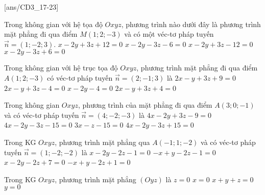 
[ans/CD3_17-23]
\TN

\begin{ex}%
	Trong không gian với hệ tọa độ $O x y z$, phương trình nào dưới đây là phương trình mặt phẳng đi qua điểm $M(1 ; 2 ;-3)$ và có một véc-tơ pháp tuyến $\vec{n}=(1 ;-2 ; 3)$.
	\choice
	{\True $x-2 y+3 z+12=0$}
	{$x-2 y-3 z-6=0$}
	{$x-2 y+3 z-12=0$}
	{$x-2 y-3 z+6=0$}
\end{ex}
\begin{ex}%
	Trong không gian với hệ trục tọa độ $Oxyz$, phương trình mặt phẳng đi qua điểm $A(1 ; 2 ;-3)$ có véc-tơ pháp tuyến $\vec{n}=(2 ;-1 ; 3)$ là
	\choice
	{\True $2 x-y+3 z+9=0$}
	{$2 x-y+3 z-4=0$}
	{$x-2 y-4=0$}
	{$2 x-y+3 z+4=0$}
\end{ex}

\begin{ex}%
	Trong không gian $O x y z$, phương trình của mặt phẳng đi qua điểm $A(3 ; 0 ;-1)$ và có véc-tơ pháp tuyến $\vec{n}=(4 ;-2 ;-3)$ là
	\choice
	{$4x-2 y+3z-9=0$}
	{\True $4x-2y-3z-15=0$}
	{$3x-z-15=0$}
	{$4x-2y-3z+15=0$}
\end{ex}

\begin{ex}%
	Trong KG $Oxyz$, phương trình mặt phẳng qua $A(-1 ; 1 ;-2)$ và có véc-tơ  pháp tuyến $\vec{n}=(1 ;-2 ;-2)$ là
	\choice
	{\True $x-2 y-2 z-1=0$}
	{$-x+y-2z-1=0$}
	{$x-2y-2z+7=0$}
	{$-x+y-2z+1=0$}
\end{ex}

\begin{ex}%
	Trong KG $Oxyz$, phương trình mặt phẳng $(Oyz)$ là
	\choice
	{$z=0$}
	{\True $x=0$}
	{$x+y+z=0$}
	{$y=0$}
\end{ex}

